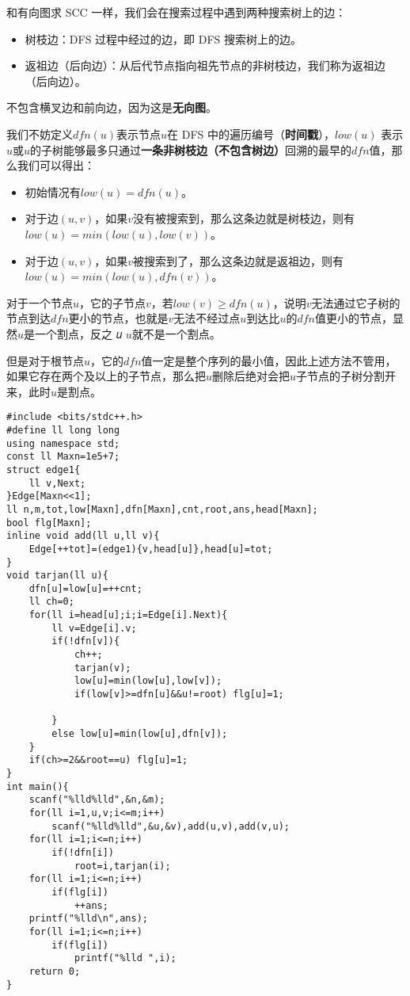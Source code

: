 \documentclass[]{article}
\providecommand{\tightlist}{%
  \setlength{\itemsep}{0pt}\setlength{\parskip}{0pt}}
\begin{document}
和有向图求 SCC 一样，我们会在搜索过程中遇到两种搜索树上的边：

\begin{itemize}
\tightlist
\item
  树枝边：DFS 过程中经过的边，即 DFS 搜索树上的边。
\item
  返祖边（后向边）：从后代节点指向祖先节点的非树枝边，我们称为返祖边（后向边）。
\end{itemize}

不包含横叉边和前向边，因为这是\textbf{无向图}。

我们不妨定义\(dfn(u)\)表示节点\(u\)在 DFS
中的遍历编号（\textbf{时间戳}），\(low(u)\)
表示\(u\)或\(u\)的子树能够最多只通过\textbf{一条非树枝边（不包含树边）}回溯的最早的\(dfn\)值，那么我们可以得出：

\begin{itemize}
\tightlist
\item
  初始情况有\(low(u)=dfn(u)\)。
\item
  对于边\((u,v)\)，如果\(v\)没有被搜索到，那么这条边就是树枝边，则有\(low(u)=min(low(u),low(v))\)。
\item
  对于边\((u,v)\)，如果\(v\)被搜索到了，那么这条边就是返祖边，则有\(low(u)=min(low(u),dfn(v))\)。
\end{itemize}

对于一个节点\(u​\)，它的子节点\(v​\)，若\(low(v)\geq dfn(u)​\)，说明\(v​\)无法通过它子树的节点到达\(dfn​\)更小的节点，也就是\(v​\)无法不经过点\(u​\)到达比\(u​\)的\(dfn​\)值更小的节点，显然\(u​\)是一个割点，反之
𝑢 \(u​\)就不是一个割点。

但是对于根节点\(u\)，它的\(dfn\)值一定是整个序列的最小值，因此上述方法不管用，如果它存在两个及以上的子节点，那么把\(u\)删除后绝对会把\(u\)子节点的子树分割开来，此时\(u\)是割点。

\begin{verbatim}
#include <bits/stdc++.h>
#define ll long long
using namespace std;
const ll Maxn=1e5+7;
struct edge1{
    ll v,Next;
}Edge[Maxn<<1];
ll n,m,tot,low[Maxn],dfn[Maxn],cnt,root,ans,head[Maxn];
bool flg[Maxn];
inline void add(ll u,ll v){
    Edge[++tot]=(edge1){v,head[u]},head[u]=tot;
}
void tarjan(ll u){
    dfn[u]=low[u]=++cnt;
    ll ch=0;
    for(ll i=head[u];i;i=Edge[i].Next){
        ll v=Edge[i].v;
        if(!dfn[v]){
            ch++;
            tarjan(v);
            low[u]=min(low[u],low[v]);
            if(low[v]>=dfn[u]&&u!=root) flg[u]=1;
            
        }
        else low[u]=min(low[u],dfn[v]);
    }
    if(ch>=2&&root==u) flg[u]=1;
}
int main(){
    scanf("%lld%lld",&n,&m);
    for(ll i=1,u,v;i<=m;i++) 
        scanf("%lld%lld",&u,&v),add(u,v),add(v,u); 
    for(ll i=1;i<=n;i++)
        if(!dfn[i])
            root=i,tarjan(i);
    for(ll i=1;i<=n;i++)
        if(flg[i])
            ++ans;
    printf("%lld\n",ans);
    for(ll i=1;i<=n;i++)
        if(flg[i])
            printf("%lld ",i);
    return 0;
}
\end{verbatim}
\end{document}
